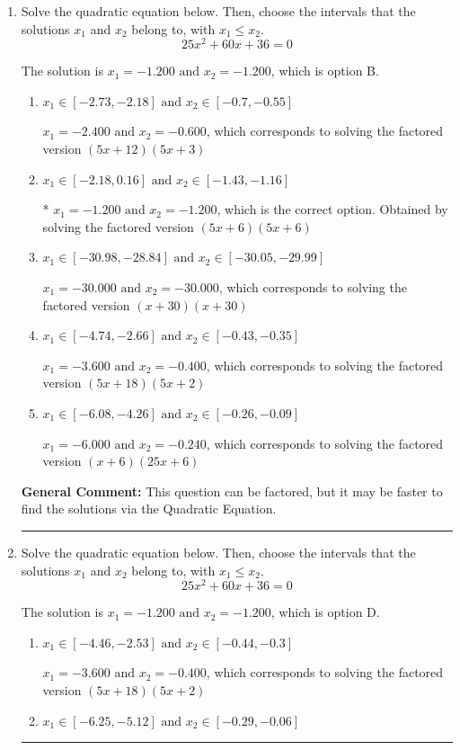 \documentclass{extbook}[14pt]
\newcommand{\litem}[1]{\item #1

\rule{\textwidth}{0.4pt}}
\begin{document}
\begin{enumerate}\litem{
Solve the quadratic equation below. Then, choose the intervals that the solutions $x_1$ and $x_2$ belong to, with $x_1 \leq x_2$.
\[ 25x^{2} +60 x + 36 = 0 \]

The solution is \( x_1 = -1.200 \text{ and } x_2 = -1.200 \), which is option B.\begin{enumerate}[label=\Alph*.]
\item \( x_1 \in [-2.73, -2.18] \text{ and } x_2 \in [-0.7, -0.55] \)

$x_1 = -2.400 \text{ and } x_2 = -0.600$, which corresponds to solving the factored version $(5x + 12)(5x + 3)$
\item \( x_1 \in [-2.18, 0.16] \text{ and } x_2 \in [-1.43, -1.16] \)

* $x_1 = -1.200 \text{ and } x_2 = -1.200$, which is the correct option. Obtained by solving the factored version $(5x + 6)(5x + 6)$
\item \( x_1 \in [-30.98, -28.84] \text{ and } x_2 \in [-30.05, -29.99] \)

$x_1 = -30.000 \text{ and } x_2 = -30.000$, which corresponds to solving the factored version $(x + 30)(x + 30)$
\item \( x_1 \in [-4.74, -2.66] \text{ and } x_2 \in [-0.43, -0.35] \)

$x_1 = -3.600 \text{ and } x_2 = -0.400$, which corresponds to solving the factored version $(5x + 18)(5x + 2)$
\item \( x_1 \in [-6.08, -4.26] \text{ and } x_2 \in [-0.26, -0.09] \)

$x_1 = -6.000 \text{ and } x_2 = -0.240$, which corresponds to solving the factored version $(x + 6)(25x + 6)$
\end{enumerate}

\textbf{General Comment:} This question can be factored, but it may be faster to find the solutions via the Quadratic Equation.
}
\litem{
Solve the quadratic equation below. Then, choose the intervals that the solutions $x_1$ and $x_2$ belong to, with $x_1 \leq x_2$.
\[ 25x^{2} +60 x + 36 = 0 \]

The solution is \( x_1 = -1.200 \text{ and } x_2 = -1.200 \), which is option D.\begin{enumerate}[label=\Alph*.]
\item \( x_1 \in [-4.46, -2.53] \text{ and } x_2 \in [-0.44, -0.3] \)

$x_1 = -3.600 \text{ and } x_2 = -0.400$, which corresponds to solving the factored version $(5x + 18)(5x + 2)$
\item \( x_1 \in [-6.25, -5.12] \text{ and } x_2 \in [-0.29, -0.06] \)


\end{enumerate}}
\end{enumerate}
\end{document}
